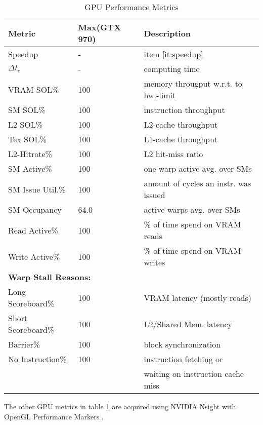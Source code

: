 \documentclass[m,times]{cgMA}
\begin{document}
\begin{table}
  \begin{tabular}{ | l | l | l |}    \hline
    \textbf{Metric}   & \textbf{Max}(GTX 970) & \textbf{Description} \\ \hline
    Speedup           & -                     & item \ref{it:speedup}\\\hline
    $\Delta t_c$      & -                     & computing time\\\hline
    VRAM SOL\%        & 100                   & memory througput w.r.t. to hw.-limit\\\hline
    SM SOL\%          & 100                   & instruction throughput\\\hline
    L2 SOL\%          & 100                   & L2-cache throughput\\\hline
    Tex SOL\%         & 100                   & L1-cache throughput\\\hline
    L2-Hitrate\%      & 100                   & L2 hit-miss ratio\\\hline
    SM Active\%       & 100                   & one warp active avg. over SMs\\\hline
    SM Issue Util.\%  & 100                   & amount of cycles an instr. was issued\\\hline
    SM Occupancy      & 64.0                  & active warps avg. over SMs\\\hline
    Read Active\%     & 100                   & \% of time spend on VRAM reads\\\hline
    Write Active\%    & 100                   & \% of time spend on VRAM writes\\\hline
    \multicolumn{3}{|l|}{\textbf{Warp Stall Reasons:}}\\\hline
    Long Scoreboard\% & 100                   & VRAM latency (mostly reads)\\\hline
    Short Scoreboard\%& 100                   & L2/Shared Mem. latency\\\hline
    Barrier\%         & 100                   & block synchronization \\\hline
    No Instruction\%  & 100                   & instruction fetching or\\
		      &                       & waiting on instruction cache miss\\\hline
  \end{tabular}
\caption{GPU Performance Metrics}\label{table:metric}
\end{table}
The other GPU metrics in table \ref{table:metric} are acquired using NVIDIA Nsight with OpenGL Performance Markers \cite{NVIDIA:METRICS}.
\end{document}
